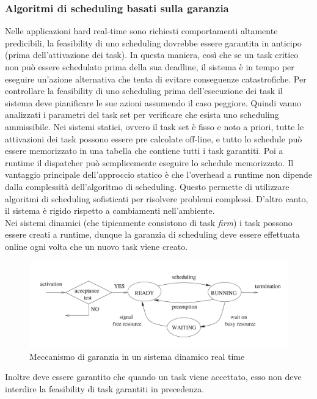 \documentclass[12pt]{article}
\begin{document}
\subsubsection{Algoritmi di scheduling basati sulla garanzia}
Nelle applicazioni hard real-time sono richiesti comportamenti altamente predicibili, la feasibility di uno scheduling dovrebbe essere garantita in anticipo (prima dell'attivazione dei task).
In questa maniera, così che se un task critico non può essere schedulato prima della sua deadline, il sistema è in tempo per eseguire un'azione alternativa che tenta di evitare conseguenze catastrofiche.
Per controllare la feasibility di uno scheduling prima dell'esecuzione dei task il sistema deve pianificare le sue azioni assumendo il caso peggiore.
Quindi vanno analizzati i parametri del task set per verificare che esista uno scheduling ammissibile.
Nei sistemi statici, ovvero il task set è fisso e noto a priori, tutte le attivazioni dei task possono essere pre calcolate off-line, e tutto lo schedule può essere memorizzato in una tabella che contiene tutti i task garantiti.
Poi a runtime il dispatcher può semplicemente eseguire lo schedule memorizzato. Il vantaggio principale dell'approccio statico è che l'overhead a runtime non dipende dalla complessità dell'algoritmo di scheduling.
Questo permette di utilizzare algoritmi di scheduling sofisticati per risolvere problemi complessi. D'altro canto, il sistema è rigido rispetto a cambiamenti nell'ambiente.\\
Nei sistemi dinamici (che tipicamente consistono di task \textit{firm}) i task possono essere creati a runtime, dunque la garanzia di scheduling deve essere effettuata online ogni volta che un nuovo task viene creato.
\begin{figure}[H]
    \centering
    \includegraphics[width=\textwidth]{pictures/garanziaDinamica.png}
    \caption{Meccanismo di garanzia in un sistema dinamico real time}
\end{figure}
\noindent Inoltre deve essere garantito che quando un task viene accettato, esso non deve interdire la feasibility di task garantiti in precedenza.
\end{document}
